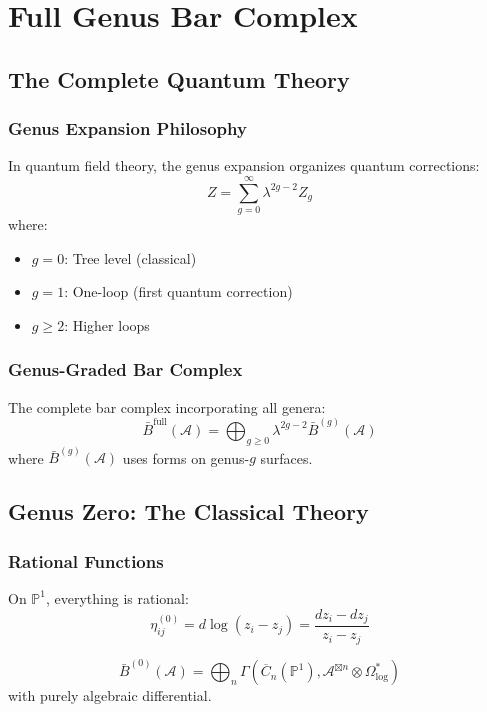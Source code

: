 \chapter{Full Genus Bar Complex}

\section{The Complete Quantum Theory}

\subsection{Genus Expansion Philosophy}

In quantum field theory, the genus expansion organizes quantum corrections:
$$Z = \sum_{g=0}^{\infty} \lambda^{2g-2} Z_g$$
where:
\begin{itemize}
\item $g = 0$: Tree level (classical)
\item $g = 1$: One-loop (first quantum correction)
\item $g \geq 2$: Higher loops
\end{itemize}

\subsection{Genus-Graded Bar Complex}

\begin{definition}
The complete bar complex incorporating all genera:
$$\bar{B}^{\text{full}}(\mathcal{A}) = \bigoplus_{g \geq 0} \lambda^{2g-2} \bar{B}^{(g)}(\mathcal{A})$$
where $\bar{B}^{(g)}(\mathcal{A})$ uses forms on genus-$g$ surfaces.
\end{definition}

\section{Genus Zero: The Classical Theory}

\subsection{Rational Functions}

On $\mathbb{P}^1$, everything is rational:
$$\eta_{ij}^{(0)} = d\log(z_i - z_j) = \frac{dz_i - dz_j}{z_i - z_j}$$

\begin{theorem}
$$\bar{B}^{(0)}(\mathcal{A}) = \bigoplus_n \Gamma(\overline{C}_n(\mathbb{P}^1), \mathcal{A}^{\boxtimes n} \otimes \Omega^*_{\text{log}})$$
with purely algebraic differential.
\end{theorem}

